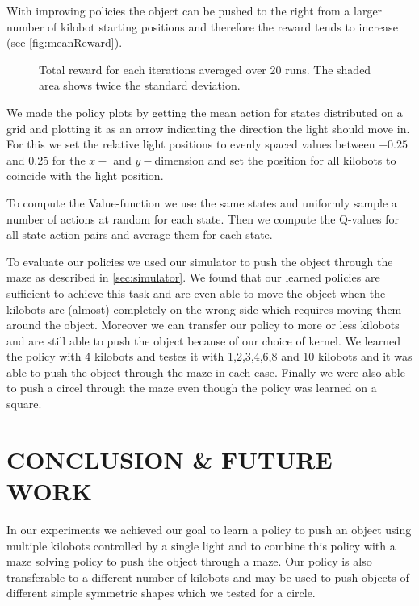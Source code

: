 \documentclass[twoside]{article}
\begin{document}
With improving policies the object can be pushed to the right from a larger
number of kilobot starting positions and therefore the reward tends to increase
(see \autoref{fig:meanReward}).

\begin{figure}[!htb]
    \centering
    \resizebox{\linewidth}{!}{}
    \caption{Total reward for each iterations averaged over 20 runs. The shaded
             area shows twice the standard deviation.}
    \label{fig:meanReward}
\end{figure}

We made the policy plots by getting the mean action for states distributed on a
grid and plotting it as an arrow indicating the direction the light should move
in. For this we set the relative light positions to evenly spaced values between
$-0.25$ and $0.25$ for the $x-$ and $y-$dimension and set the position for all
kilobots to coincide with the light position.

To compute the Value-function we use the same states and uniformly sample a
number of actions at random for each state. Then we compute the Q-values for all
state-action pairs and average them for each state.

To evaluate our policies we used our simulator to push the object through the
maze as described in \ref{sec:simulator}. We found that our learned policies are
sufficient to achieve this task and are even able to move the object when the
kilobots are (almost) completely on the wrong side which requires moving them
around the object. Moreover we can transfer our policy to more or less kilobots
and are still able to push the object because of our choice of kernel. We
learned the policy with 4 kilobots and testes it with 1,2,3,4,6,8 and 10
kilobots and it was able to push the object through the maze in each case.
Finally we were also able to push a circel through the maze even though the
policy was learned on a square.

\section{CONCLUSION \& FUTURE WORK}

In our experiments we achieved our goal to learn a policy to push an object
using multiple kilobots controlled by a single light and to combine this policy
with a maze solving policy to push the object through a maze. Our policy is also
transferable to a different number of kilobots and may be used to push objects of
different simple symmetric shapes which we tested for a circle.
\end{document}
